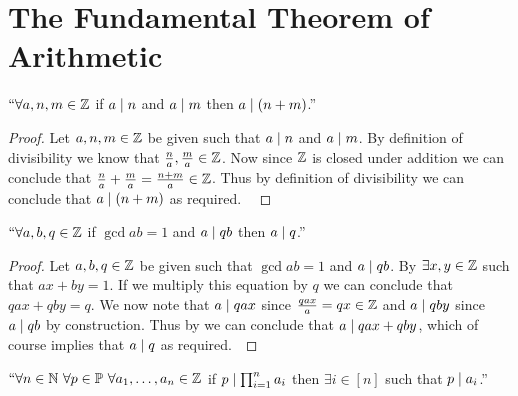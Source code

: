     \section[Fundamental Theorem of Arithmetic]{The Fundamental Theorem of Arithmetic}
        \begin{lemma}
            $``\forall a, n, m \in \mathbb{Z}$ if $a \mid n$ and $a \mid m$ then
            $a \mid (n + m)$.''
            \label{FTA lemma 1}
        \end{lemma}
        \begin{proof}
            Let $a, n, m \in \mathbb{Z}$ be given such that $a \mid n$ and $a \mid m$.
            By definition of divisibility we know that $\frac{n}{a}, \frac{m}{a} \in \mathbb{Z}$.
            Now since $\mathbb{Z}$ is closed under addition we can conclude that 
            $\frac{n}{a} + \frac{m}{a} = \frac{n + m}{a} \in \mathbb{Z}$. Thus by definition of
            divisibility we can conclude that $a \mid (n + m)$ as required.
           ~\QED
        \end{proof}
        \begin{lemma}
            $``\forall a, b, q \in \mathbb{Z}$ if $\gcd{a}{b} = 1$ and $a \mid qb$ then
            $a \mid q$.''
            \label{FTA lemma 2}
        \end{lemma}
        \begin{proof}
            Let $a, b, q \in \mathbb{Z}$ be given such that $\gcd{a}{b} = 1$ and $a \mid qb$.
            By  $\exists x, y \in \mathbb{Z}$ such that
            $ax + by = 1$. If we multiply this equation by $q$ we can conclude that
            $qax + qby = q$. We now note that $a \mid qax$ since $\frac{qax}{a} = qx \in \mathbb{Z}$
            and $a \mid qby$ since $a \mid qb$ by construction. Thus by
             we can conclude that $a \mid qax + qby$, which of course
            implies that $a \mid q$ as required.~\QED
        \end{proof}
        \begin{lemma}
            $``\forall n \in \mathbb{N} \ \forall p \in \mathbb{P} \ \forall a_1, \dots, a_n \in \mathbb{Z}$
            if $p \mid \prod_{i = 1}^{n} a_i$ then $\exists i \in [n]$ such that $p \mid a_i$.''
            \label{FTA Lemma 3}
        \end{lemma}
